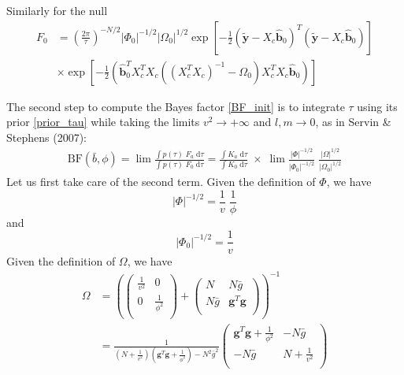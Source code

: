 \documentclass[10pt]{article}
\newcommand{\BF}{{\text{BF}}} %
\newcommand{\der}{{\text{d}}} %
\begin{document}
Similarly for the null
\begin{equation}
  \begin{aligned}
    F_0 &= \left(\frac{2\pi}{\tau}\right)^{-N/2} |\Phi_0|^{-1/2} |\Omega_0|^{1/2} \exp \left[-\frac{1}{2} (\tilde{\bm{y}} -X_c \hat{\bm{b}}_0)^T (\tilde{\bm{y}} -X_c \hat{\bm{b}}_0) \right] \\
    &\times \exp \left[-\frac{1}{2} (\hat{\bm{b}}_0^T X_c^T X_c ((X_c^T X_c)^{-1} - \Omega_0) X_c^T X_c \hat{\bm{b}}_0) \right]
  \end{aligned}
\end{equation}

The second step to compute the Bayes factor \eqref{BF_init} is to integrate $\tau$ using its prior \eqref{prior_tau} while taking the limits $v^2 \to +\infty$ and $l,m \to 0$, as in Servin \& Stephens (2007):
\begin{equation}
  \begin{aligned}
    \BF(\bar{b},\phi) = \lim \frac{\int p(\tau) \; F_a \; \der \tau}{\int p(\tau) \; F_0 \; \der \tau} = \frac{\int K_a \; \der \tau}{\int K_0 \; \der \tau} \; \times \; \lim \frac{|\Phi|^{-1/2}}{|\Phi_0|^{-1/2}} \; \frac{|\Omega|^{1/2}}{|\Omega_0|^{1/2}}
    \label{BF_lim}
  \end{aligned}
\end{equation}
Let us first take care of the second term. Given the definition of $\Phi$, we have
\[
|\Phi|^{-1/2} = \frac{1}{v} \; \frac{1}{\phi}
\]
and
\[
|\Phi_0|^{-1/2} = \frac{1}{v}
\]
Given the definition of $\Omega$, we have
\begin{equation}
  \begin{aligned}
    \Omega &=
    \left(
      \begin{pmatrix}
        \frac{1}{v^2} & 0 \\
        0 & \frac{1}{\phi^2} \\
      \end{pmatrix}
      +
      \begin{pmatrix}
        N & N \bar{g} \\
        N \bar{g} & \bm{g}^T \bm{g} \\
      \end{pmatrix}
    \right)^{-1} \\
    &= \frac{1}{(N + \frac{1}{v^2}) (\bm{g}^T \bm{g} + \frac{1}{\phi^2}) - N^2 \bar{g}^2}
    \begin{pmatrix}
      \bm{g}^T \bm{g} + \frac{1}{\phi^2} & - N \bar{g} \\
      - N \bar{g} & N + \frac{1}{v^2} \\
    \end{pmatrix}
  \end{aligned}
\end{equation}
\end{document}
